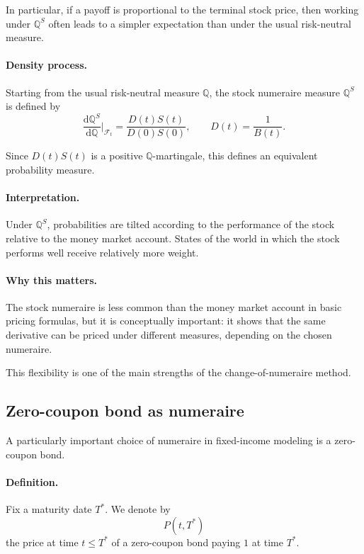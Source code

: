 \documentclass[11pt]{article}
\newcommand{\Qbb}{\mathbb{Q}}
\theoremstyle{definition}
\theoremstyle{plain}
\begin{document}
In particular, if a payoff is proportional to the terminal stock price,
then working under \(\Qbb^S\) often leads to a simpler expectation than
under the usual risk-neutral measure.

\paragraph{Density process.}
Starting from the usual risk-neutral measure \(\Qbb\), the stock
numeraire measure \(\Qbb^S\) is defined by
\[
\frac{\mathrm{d}\Qbb^S}{\mathrm{d}\Qbb}\Big|_{\mathcal{F}_t}
=
\frac{D(t)S(t)}{D(0)S(0)},
\qquad D(t)=\frac1{B(t)}.
\]

Since \(D(t)S(t)\) is a positive \(\Qbb\)-martingale, this defines an
equivalent probability measure.

\paragraph{Interpretation.}
Under \(\Qbb^S\), probabilities are tilted according to the performance
of the stock relative to the money market account.
States of the world in which the stock performs well receive relatively
more weight.

\paragraph{Why this matters.}
The stock numeraire is less common than the money market account in
basic pricing formulas, but it is conceptually important:
it shows that the same derivative can be priced under different
measures, depending on the chosen numeraire.

This flexibility is one of the main strengths of the
change-of-numeraire method.


\subsection{Zero-coupon bond as numeraire}

A particularly important choice of numeraire in fixed-income modeling is
a zero-coupon bond.

\paragraph{Definition.}
Fix a maturity date \(T^\ast\).
We denote by
\[
P(t,T^\ast)
\]
the price at time \(t\leq T^\ast\) of a zero-coupon bond paying \(1\) at
time \(T^\ast\).
\end{document}
